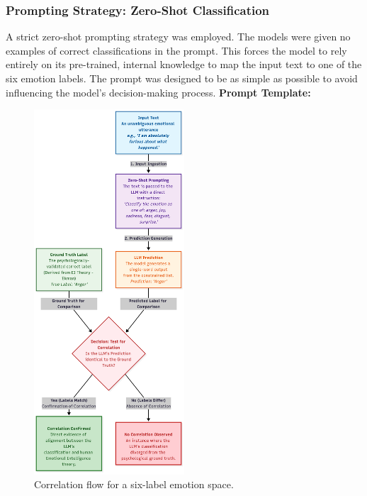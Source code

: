 \subsubsection{Prompting Strategy: Zero-Shot Classification}
A strict zero-shot prompting strategy was employed. The models were given no examples of correct classifications in the prompt. This forces the model to rely entirely on its pre-trained, internal knowledge to map the input text to one of the six emotion labels. The prompt was designed to be as simple as possible to avoid influencing the model's decision-making process.
\newpage
\textbf{Prompt Template:}

\noindent{}
\begin{figure}[H]
    \centering
    \includegraphics[width=0.5\textwidth]{Images/iteration0_correlation_flowchart.png}
    \caption{Correlation flow for a six-label emotion space.}
    \label{fig:iteration0_flowchart}
\end{figure}

